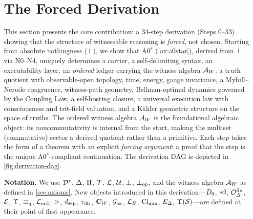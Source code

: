
\section{The Forced Derivation}
\label{sec:derivation}

This section presents the core contribution: a 34-step derivation (Steps 0--33) showing
that the structure of witnessable reasoning is \emph{forced}, not chosen.
Starting from absolute nothingness ($\bot$), we show that A0$^*$
(\cref{ax:a0star}), derived from $\bot$ via N0--N4, uniquely determines a carrier, a self-delimiting syntax, an
executability layer, an \emph{ordered} ledger carrying the witness algebra
$\mathcal{A}_W$, a truth quotient with observable-open topology,
time, energy, gauge invariance, a Myhill--Nerode congruence, witness-path
geometry, Bellman-optimal dynamics governed by the Coupling Law, a self-hosting closure, a universal
execution law with consciousness and trit-field valuation, and a K\"{a}hler
geometric structure on the space of truths.
The ordered witness algebra $\mathcal{A}_W$ is the foundational algebraic object:
its noncommutativity is internal from the start, making the multiset
(commutative) sector a derived quotient rather than a primitive.
Each step takes the form of a theorem with an explicit
\emph{forcing argument}: a proof that the step is the unique
A0$^*$-compliant continuation.  The derivation DAG is depicted in
\cref{fig:derivation-dag}.

\bigskip\noindent
\textbf{Notation.}  We use $\mathcal{D}^*$, $\Delta$, $\Pi$, $\mathcal{T}$, $\mathcal{L}$,
$\mathcal{U}$, $\bot$, $\bot_{\mathrm{op}}$, and the witness algebra $\mathcal{A}_W$ as defined in
\cref{sec:axioms}.  New objects introduced in this derivation---$D_0$,
$\mathrm{sd}$, $\mathcal{O}^{\mathrm{fin}}_\Delta$, $\mathcal{E}$, $\Upsilon$, $\equiv_q$, $\mathcal{L}_{\mathrm{ord}}$,
$\mathbin{\vartriangleright}$, $d_{\mathrm{sep}}$, $\tau_{\mathrm{dir}}$, $\mathbf{C}_W$, $\mathcal{G}_{\mathrm{ex}}$, $\mathcal{L}_E$,
$\mathrm{Cl}_{\min}$, $E_\Delta$, $\Upsilon(\mathcal{S})$---are defined at their point of first
appearance.

